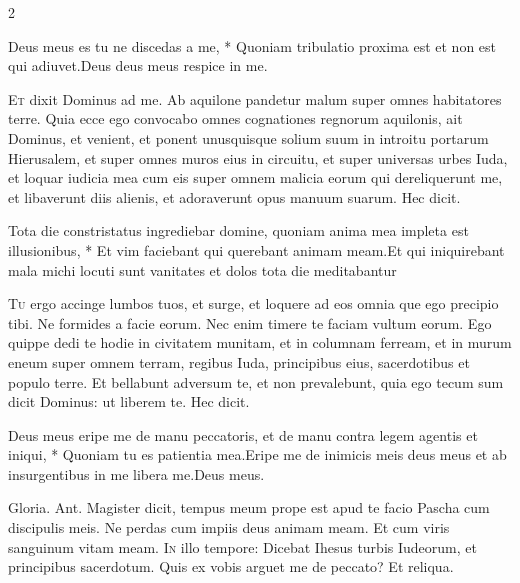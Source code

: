 \begin{multicols*}{2}
\begin{responsory}
{Deus meus es tu ne discedas a me, * Quoniam tribulatio proxima est et non est qui adiuvet.}{Deus deus meus respice in me.}
\end{responsory}%
\lettrine[lines=2]{\zallmancaps \color{Blue} E}{t} dixit Dominus ad me. Ab aquilone pandetur malum super omnes habitatores terre. Quia ecce ego convocabo omnes cognationes regnorum aquilonis, ait Dominus, et venient, et ponent unusquisque solium suum in introitu portarum Hierusalem, et super omnes muros eius in circuitu, et super universas urbes Iuda, et loquar iudicia mea cum eis super omnem malicia eorum qui dereliquerunt me, et libaverunt diis alienis, et adoraverunt opus manuum suarum. Hec dicit.
\begin{responsory}
{Tota die constristatus ingrediebar domine, quoniam anima mea impleta est illusionibus, * Et vim faciebant qui querebant animam meam.}{Et qui iniquirebant mala michi locuti sunt vanitates et dolos tota die meditabantur}
\end{responsory}%
\lettrine[lines=2]{\zallmancaps \color{Red} T}{u} ergo accinge lumbos tuos, et surge, et loquere ad eos omnia que ego precipio tibi. Ne formides a facie eorum. Nec enim timere te faciam vultum eorum. Ego quippe dedi te hodie in civitatem munitam, et in columnam ferream, et in murum eneum super omnem terram, regibus Iuda, principibus eius, sacerdotibus et populo terre. Et bellabunt adversum te, et non prevalebunt, quia ego tecum sum dicit Dominus: ut liberem te. Hec dicit.
\begin{responsory}
{Deus meus eripe me de manu peccatoris, et de manu contra legem agentis et iniqui, * Quoniam tu es patientia mea.}{Eripe me de inimicis meis deus meus et ab insurgentibus in me libera me.}Deus meus.
\end{responsory}%
 Gloria. {\color{Red} Ant.} Magister dicit, tempus meum prope est apud te facio Pascha cum discipulis meis. \V Ne perdas cum impiis deus animam meam. \R Et cum viris sanguinum vitam meam.
\lettrine[lines=2]{\zallmancaps \color{Blue} I}{n} illo tempore: Dicebat Ihesus turbis Iudeorum, et principibus sacerdotum. Quis ex vobis arguet me de peccato? Et reliqua.

\end{multicols*}
